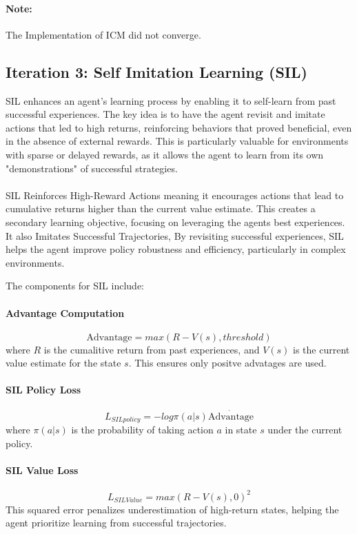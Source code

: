 \documentclass[
12pt, %
oneside, %
english, %
onehalfspacing, %
nolistspacing, %
liststotoc, %
headsepline, %
]{ProposalAndThesis} %
\begin{document}
\paragraph{Note:} The Implementation of ICM did not converge.
\subsection{Iteration 3: Self Imitation Learning (SIL)}
SIL enhances an agent's learning process by enabling it to self-learn from past successful experiences. The key idea is to have the agent revisit and imitate actions that led to high returns, reinforcing behaviors that proved beneficial, even in the absence of external rewards. This is particularly valuable for environments with sparse or delayed rewards, as it allows the agent to learn from its own "demonstrations" of successful strategies.
\\\\
\noindent SIL Reinforces High-Reward Actions meaning it encourages actions that lead to cumulative returns higher than the current value estimate. This creates a secondary learning objective, focusing on leveraging the agents best experiences. It also Imitates Successful Trajectories, By revisiting successful experiences, SIL helps the agent improve policy robustness and efficiency, particularly in complex environments.

The components for  SIL include:

\paragraph{Advantage Computation}

\[\text{Advantage} = max(R - V(s), threshold)\]
where \(R\) is the cumalitive return from past experiences, and \(V(s)\) is the current value estimate for the state \(s\). This ensures only positve advatages are used.

\paragraph{SIL Policy Loss}

\[L_{SIL policy} = -log\pi(a|s)\dot{\text{Advantage}}\]
where \(\pi(a|s)\) is the probability of taking action \(a\) in state \(s\) under the current policy.

\paragraph{SIL Value Loss}
\[L_{SIL Value} = max(R - V(s),0)^{2}\]
This squared error penalizes underestimation of high-return states, helping the agent prioritize learning from successful trajectories.
\end{document}
